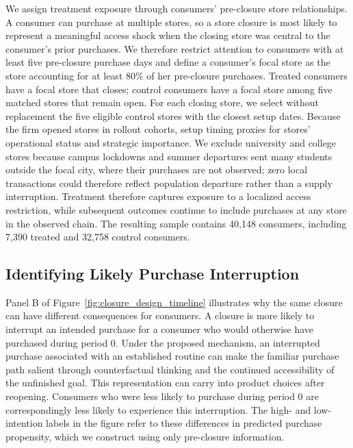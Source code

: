\documentclass[11 pt]{article}
\begin{document}
We assign treatment exposure through consumers' pre-closure store relationships. A consumer can purchase at multiple stores, so a store closure is most likely to represent a meaningful access shock when the closing store was central to the consumer's prior purchases. We therefore restrict attention to consumers with at least five pre-closure purchase days and define a consumer's focal store as the store accounting for at least 80\% of her pre-closure purchases. Treated consumers have a focal store that closes; control consumers have a focal store among five matched stores that remain open. For each closing store, we select without replacement the five eligible control stores with the closest setup dates. Because the firm opened stores in rollout cohorts, setup timing proxies for stores' operational status and strategic importance. We exclude university and college stores because campus lockdowns and summer departures sent many students outside the focal city, where their purchases are not observed; zero local transactions could therefore reflect population departure rather than a supply interruption. Treatment therefore captures exposure to a localized access restriction, while subsequent outcomes continue to include purchases at any store in the observed chain. The resulting sample contains 40,148 consumers, including 7,390 treated and 32,758 control consumers.

\subsection{Identifying Likely Purchase Interruption}
\label{section:classifier}

Panel B of Figure~\ref{fig:closure_design_timeline} illustrates why the same closure can have different consequences for consumers. A closure is more likely to interrupt an intended purchase for a consumer who would otherwise have purchased during period 0. Under the proposed mechanism, an interrupted purchase associated with an established routine can make the familiar purchase path salient through counterfactual thinking and the continued accessibility of the unfinished goal. This representation can carry into product choices after reopening. Consumers who were less likely to purchase during period 0 are correspondingly less likely to experience this interruption. The high- and low-intention labels in the figure refer to these differences in predicted purchase propensity, which we construct using only pre-closure information.
\end{document}
